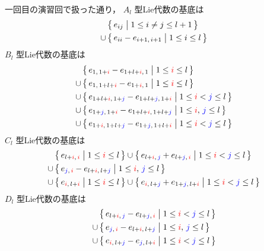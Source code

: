 \documentclass{ltjsarticle}
\theoremstyle{mystyle} %
\numberwithin{equation}{section}
\begin{document}
一回目の演習回で扱った通り，
$A_l$ 型Lie代数の基底は
\begin{align}
    &\bigl\{\, e_{ij} \bigm| 1 \le i \neq j \le l+1 \,\bigr\} \\
    \cup\, &\bigl\{\, e_{ii} - e_{i+1,\, i+1} \bigm| 1 \le i \le l \,\bigr\} 
\end{align}
$B_l$ 型Lie代数の基底は
\begin{align}
    &\bigl\{\, e_{1,\, 1 + \textcolor{red}{i}} - e_{1 + l + \textcolor{red}{i},\, 1} \bigm| 1 \le \textcolor{red}{i} \le l \,\bigr\} \\
    \cup\, &\bigl\{\, e_{1,\, 1 + l + \textcolor{red}{i}} - e_{1 + \textcolor{red}{i},\, 1} \bigm| 1 \le \textcolor{red}{i} \le l \,\bigr\} \\
    \cup\, &\bigl\{\, e_{1 + l + \textcolor{red}{i},\, 1 + \textcolor{blue}{j}} - e_{1 + l + \textcolor{blue}{j},\, 1 + \textcolor{red}{i}} \bigm| 1 \le \textcolor{red}{i} < \textcolor{blue}{j} \le l \,\bigr\} \\
    \cup\, &\bigl\{\, e_{1 + \textcolor{blue}{j},\, 1 + \textcolor{red}{i}} - e_{1 + l + \textcolor{red}{i},\, 1 + l + \textcolor{blue}{j}} \bigm| 1 \le \textcolor{red}{i},\, \textcolor{blue}{j} \le l \,\bigr\}  \\
    \cup\, &\bigl\{\, e_{1 + \textcolor{red}{i},\, 1 + l + \textcolor{blue}{j}} - e_{1 + \textcolor{blue}{j},\, 1 + l + \textcolor{red}{i}} \bigm| 1 \le \textcolor{red}{i} < \textcolor{blue}{j} \le l \,\bigr\} 
\end{align}
$C_l$ 型Lie代数の基底は
\begin{align}
    &\bigl\{\, e_{l + \textcolor{red}{i},\, \textcolor{red}{i}} \bigm| 1 \le \textcolor{red}{i} \le l \,\bigr\} \cup \bigl\{\, e_{l + \textcolor{red}{i},\, \textcolor{blue}{j}} + e_{l + \textcolor{blue}{j},\, \textcolor{red}{i}} \bigm| 1 \le \textcolor{red}{i} < \textcolor{blue}{j} \le l \,\bigr\} \\
    \cup\, &\bigl\{\, e_{\textcolor{blue}{j},\, \textcolor{red}{i}} - e_{l + \textcolor{red}{i},\, l + \textcolor{blue}{j}} \bigm| 1 \le \textcolor{red}{i},\, \textcolor{blue}{j} \le l \,\bigr\}  \\
    \cup\, &\bigl\{\, e_{\textcolor{red}{i},\, l + \textcolor{red}{i}} \bigm| 1 \le \textcolor{red}{i} \le l \,\bigr\} \cup \bigl\{\, e_{\textcolor{red}{i},\, l + \textcolor{blue}{j}} + e_{1 + \textcolor{blue}{j},\, l + \textcolor{red}{i}} \bigm| 1 \le \textcolor{red}{i} < \textcolor{blue}{j} \le l \,\bigr\} 
\end{align}
$D_l$ 型Lie代数の基底は
\begin{align}
    &\bigl\{\, e_{l + \textcolor{red}{i},\, \textcolor{blue}{j}} - e_{l + \textcolor{blue}{j},\, \textcolor{red}{i}} \bigm| 1 \le \textcolor{red}{i} < \textcolor{blue}{j} \le l \,\bigr\} \\
    \cup\, &\bigl\{\, e_{\textcolor{blue}{j},\, \textcolor{red}{i}} - e_{l + \textcolor{red}{i},\, l + \textcolor{blue}{j}} \bigm| 1 \le \textcolor{red}{i},\, \textcolor{blue}{j} \le l \,\bigr\}  \\
    \cup\, &\bigl\{\, e_{\textcolor{red}{i},\, l + \textcolor{blue}{j}} - e_{\textcolor{blue}{j},\, l + \textcolor{red}{i}} \bigm| 1 \le \textcolor{red}{i} < \textcolor{blue}{j} \le l \,\bigr\} 
\end{align}
\end{document}
